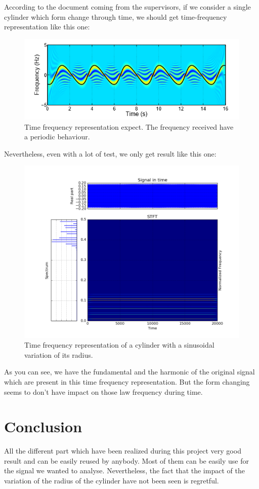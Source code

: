 According to the document coming from the supervisors, if we consider a single cylinder which form change through time, we should get time-frequency representation like this one:

\begin{figure}[H]
\centering
    \includegraphics[scale=0.6,angle=0]{Images/TFRExpected.png}
    \caption{Time frequency representation expect. The frequency received have a periodic behaviour.}
    \label{fig:TFRExpected}
\end{figure}

Nevertheless, even with a lot of test, we only get result like this one:

\begin{figure}[H]
\centering
    \includegraphics[scale=0.6,angle=0]{Images/Objx3y10.png}
    \caption{Time frequency representation of a cylinder with a sinusoidal variation of its radius.}
    \label{fig:Objx3y10}
\end{figure}

As you can see, we have the fundamental and the harmonic of the original signal which are present in this time frequency representation. But the form changing seems to don't have impact on those law frequency during time.

\chapter*{Conclusion}
\bigskip

All the different part which have been realized during this project very good result and can be easily reused by anybody.
Most of them can be easily use for the signal we wanted to analyse. Nevertheless, the fact that the impact of the variation of the radius of the cylinder have not been seen is regretful.